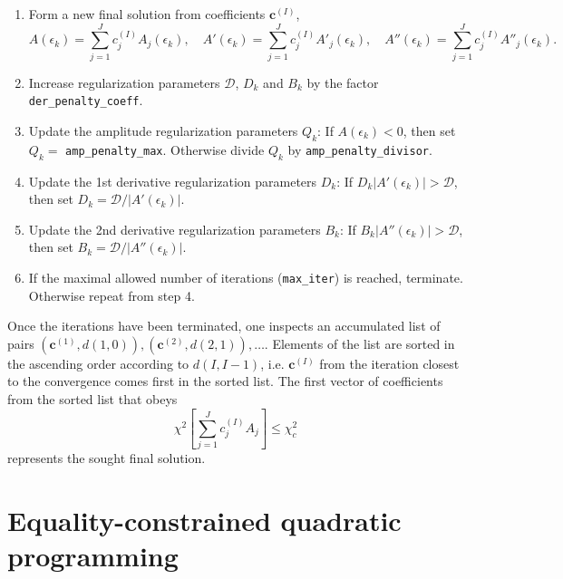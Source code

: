 \documentclass[]{article}
\begin{document}
\begin{enumerate}
    \item Form a new final solution from coefficients $\mathbf{c}^{(I)}$,
    \begin{equation}
        A(\epsilon_k) = \sum_{j=1}^J c^{(I)}_j A_j(\epsilon_k),\quad
        A'(\epsilon_k) = \sum_{j=1}^J c^{(I)}_j A'_j(\epsilon_k),\quad
        A''(\epsilon_k) = \sum_{j=1}^J c^{(I)}_j A''_j(\epsilon_k).
    \end{equation}

    \item Increase regularization parameters $\mathcal{D}$, $D_k$ and $B_k$ by
    the factor \verb|der_penalty_coeff|.

    \item Update the amplitude regularization parameters $Q_k$: If $A(\epsilon_k) < 0$, then set $Q_k =$ \verb|amp_penalty_max|. Otherwise divide $Q_k$ by \verb|amp_penalty_divisor|.

    \item Update the 1st derivative regularization parameters $D_k$:
    If $D_k |A'(\epsilon_k)| > \mathcal{D}$, then set $D_k = \mathcal{D} / |A'(\epsilon_k)|$.

    \item Update the 2nd derivative regularization parameters $B_k$:
    If $B_k |A''(\epsilon_k)| > \mathcal{D}$, then set $B_k = \mathcal{D} / |A''(\epsilon_k)|$.

    \item If the maximal allowed number of iterations (\verb|max_iter|) is reached, terminate. Otherwise repeat from step 4.
\end{enumerate}

Once the iterations have been terminated, one inspects an accumulated list of pairs $(\mathbf{c}^{(1)}, d(1,0)), (\mathbf{c}^{(2)}, d(2,1)), \ldots$. Elements of the list are sorted in the ascending order according to $d(I,I-1)$, i.e. $\mathbf{c}^{(I)}$ from the iteration closest to the convergence comes first in the sorted list. The first vector of coefficients from the sorted list that obeys
\begin{equation}
    \chi^2\left[\sum_{j=1}^J c^{(I)}_j A_j\right] \leq \chi^2_c
\end{equation}
represents the sought final solution.

\section{Equality-constrained quadratic programming}
\label{ecqp}
\end{document}
